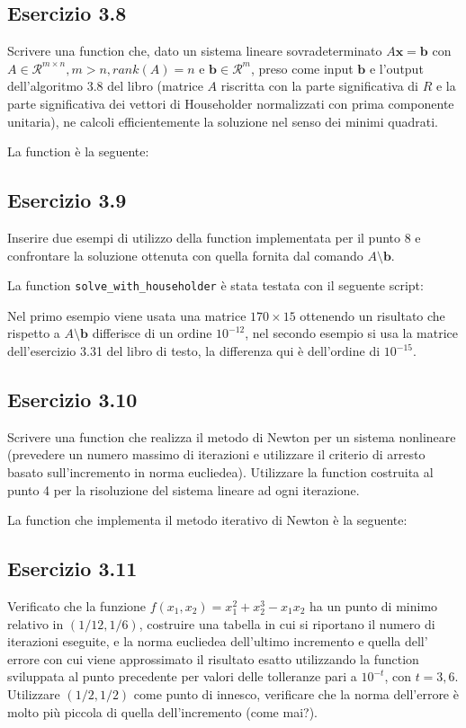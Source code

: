 	\subsection{Esercizio 3.8}
Scrivere una function che, dato un sistema lineare sovradeterminato $A\mathbf{x}=\mathbf{b}$ con $A \in \mathcal{R}^{m \times n}, m > n, rank(A) = n$ e $\mathbf{b} \in \mathcal{R}^m$, preso come input $\mathbf{b}$ e l'output dell'algoritmo 3.8 del libro (matrice $A$ riscritta con la parte significativa di $R$ e la parte significativa dei vettori di Householder normalizzati con prima componente unitaria), ne calcoli efficientemente la soluzione nel senso dei minimi quadrati.

La function è la seguente:


 
	\subsection{Esercizio 3.9}
Inserire due esempi di utilizzo della function implementata per il punto 8 e confrontare la soluzione ottenuta con quella fornita dal comando $A\setminus \mathbf{b}$.

La function \lstinline{solve_with_householder} è stata testata con il seguente script:

Nel primo esempio viene usata una matrice $170 \times 15$ ottenendo un risultato che rispetto a $A\setminus \mathbf{b}$ differisce di un ordine $10^{-12}$, nel secondo esempio si usa la matrice dell'esercizio 3.31 del libro di testo, la differenza qui è dell'ordine di $10^{-15}$.


 
	\subsection{Esercizio 3.10}
Scrivere una function che realizza il metodo di Newton per un sistema nonlineare (prevedere un numero massimo di iterazioni e utilizzare il criterio di arresto basato sull’incremento in norma eucliedea). Utilizzare la function costruita al punto 4 per la risoluzione del sistema lineare ad ogni iterazione.

	La function che implementa il metodo iterativo di Newton è la seguente:



 
	\subsection{Esercizio 3.11}
Verificato che la funzione $f(x_1,x_2) = x_1^2 + x_2^3 - x_1x_2$ ha un punto di minimo relativo in $(1/12, 1/6)$, costruire una tabella in cui si riportano il numero di iterazioni eseguite, e la norma eucliedea dell’ultimo incremento e quella dell’ errore con cui viene approssimato il risultato esatto utilizzando la function sviluppata al punto precedente per valori delle tolleranze pari a $10^{-t}$, con $t=3,6$. Utilizzare $(1/2, 1/2)$ come punto di innesco, verificare che la norma dell'errore è molto più piccola di quella dell'incremento (come mai?).

